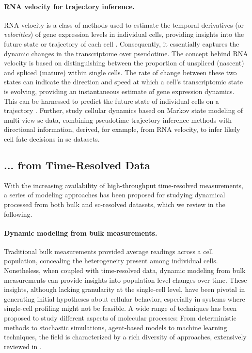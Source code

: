 \paragraph{RNA velocity for trajectory inference.}

\acrshort{RNA} velocity is a class of methods used to estimate the temporal derivatives (or \textit{velocities}) of gene expression levels in individual cells, providing insights into the future state or trajectory of each cell \citep{la2018rna}. Consequently, it essentially captures the dynamic changes in the transcriptome over pseudotime.
The concept behind \acrshort{RNA} velocity is based on distinguishing between the proportion of unspliced (nascent) and spliced (mature)  within single cells. The rate of change between these two states can indicate the direction and speed at which a cell's transcriptomic state is evolving, providing an instantaneous estimate of gene expression dynamics.
This can be harnessed to predict the future state of individual cells on a trajectory \citep{bergen2020generalizing}.
Further, \citet{lange2022cellrank} study cellular dynamics based on Markov state modeling of multi-view \acrlong{sc} data, combining pseudotime trajectory inference methods with directional information, derived, for example, from \acrshort{RNA} velocity, to infer likely cell fate decisions in \acrlong{sc} datasets.

\subsection*{... from Time-Resolved Data}

With the increasing availability of high-throughput time-resolved measurements, a series of modeling approaches has been proposed for studying dynamical processed from both bulk and \acrlong{sc}-resolved datasets, which we review in the following.

\paragraph{Dynamic modeling from bulk measurements.}

Traditional bulk measurements provided average readings across a cell population, concealing the heterogeneity present among individual cells. Nonetheless, when coupled with time-resolved data, dynamic modeling from bulk measurements can provide insights into population-level changes over time. These insights, although lacking granularity at the single-cell level, have been pivotal in generating initial hypotheses about cellular behavior, especially in systems where single-cell profiling might not be feasible. A wide range of techniques has been proposed to study different aspects of molecular processes: From deterministic methods to stochastic simulations, agent-based models to machine learning techniques, the field is characterized by a rich diversity of approaches, extensively reviewed in \citet{klipp2016systems}.

